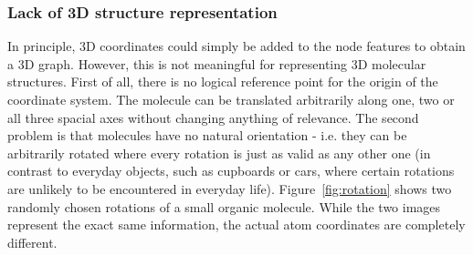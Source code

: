 \subsubsection{Lack of 3D structure representation}
\label{sec:lack-of-3d-structure}

In principle, 3D coordinates could simply be added to the node features to obtain a 3D graph. However, this is not meaningful for representing 3D molecular structures. First of all, there is no logical reference point for the origin of the coordinate system. The molecule can be translated arbitrarily along one, two or all three spacial axes without changing anything of relevance. The second problem is that molecules have no natural orientation - i.e. they can be arbitrarily rotated where every rotation is just as valid as any other one (in contrast to everyday objects, such as cupboards or cars, where certain rotations are unlikely to be encountered in everyday life). Figure~\ref{fig:rotation} shows two randomly chosen rotations of a small organic molecule. While the two images represent the exact same information, the actual atom coordinates are completely different.

